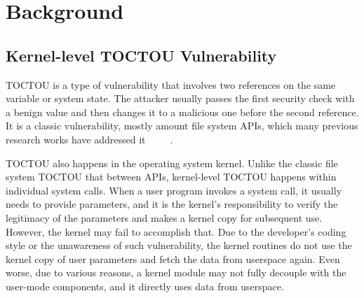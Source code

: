 
\section{Background}
\label{sec:ktoctou-background}



%



\subsection{Kernel-level TOCTOU Vulnerability}

TOCTOU is a type of vulnerability that involves two references on the same variable or system state. The attacker usually passes the first security check with a benign value and then changes it to a malicious one before the second reference. It is a classic vulnerability, mostly amount file system APIs, which many previous research works have addressed it~\cite{dean2004fixing}~\cite{borisov2005fixing}~\cite{bishop1996checking}~\cite{bishop1995race}~\cite{wei2005tocttou}.


TOCTOU also happens in the operating system kernel. Unlike the classic file system TOCTOU that between APIs, kernel-level TOCTOU happens within individual system calls. When a user program invokes a system call, it usually needs to provide parameters, and it is the kernel's responsibility to verify the legitimacy of the parameters and makes a kernel copy for subsequent use. However, the kernel may fail to accomplish that. Due to the developer's coding style or the unawareness of such vulnerability, the kernel routines do not use the kernel copy of user parameters and fetch the data from userspace again. Even worse, due to various reasons, a kernel module may not fully decouple with the user-mode components, and it directly uses data from userspace.


